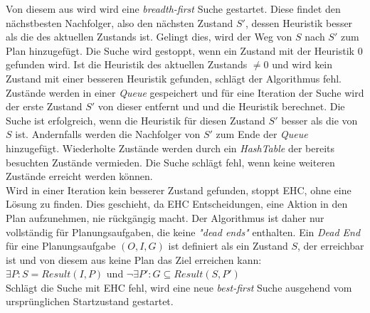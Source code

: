 Von diesem aus wird wird eine \emph{breadth-first} Suche gestartet.
Diese findet den nächstbesten Nachfolger, also den nächsten Zustand $S'$, dessen Heuristik besser als die des aktuellen Zustands ist.
Gelingt dies, wird der Weg von $S$ nach $S'$ zum Plan hinzugefügt.
Die Suche wird gestoppt, wenn ein Zustand mit der Heuristik 0 gefunden wird.
Ist die Heuristik des aktuellen Zustands $\neq 0$ und wird kein Zustand mit einer besseren Heuristik gefunden, schlägt der Algorithmus fehl.
Zustände werden in einer \emph{Queue} gespeichert und für eine Iteration der Suche wird der erste Zustand $S'$ von dieser entfernt und und die Heuristik berechnet.
Die Suche ist erfolgreich, wenn die Heuristik für diesen Zustand $S'$ besser als die von $S$ ist.
Andernfalls werden die Nachfolger von $S'$ zum Ende der \emph{Queue} hinzugefügt.
Wiederholte Zustände werden durch ein \emph{HashTable} der bereits besuchten Zustände vermieden.
Die Suche schlägt fehl, wenn keine weiteren Zustände erreicht werden können.\\
Wird in einer Iteration kein besserer Zustand gefunden, stoppt \ac{EHC}, ohne eine Lösung zu finden.
Dies geschieht, da \ac{EHC} Entscheidungen, eine Aktion in den Plan aufzunehmen, nie rückgängig macht.
Der Algorithmus ist daher nur vollständig für Planungsaufgaben, die keine \emph{"dead ends"} enthalten.
Ein \emph{Dead End} für eine Planungsaufgabe $(O,I,G)$ ist definiert als ein Zustand $S$, der erreichbar ist und von diesem aus keine Plan das Ziel erreichen kann:\\
$\exists P: S = Result(I,P)$  und  $\neg\exists P': G\subseteq Result(S,P')$\\
Schlägt die Suche mit \ac{EHC} fehl, wird eine neue \emph{best-first} Suche ausgehend vom ursprünglichen Startzustand gestartet.
